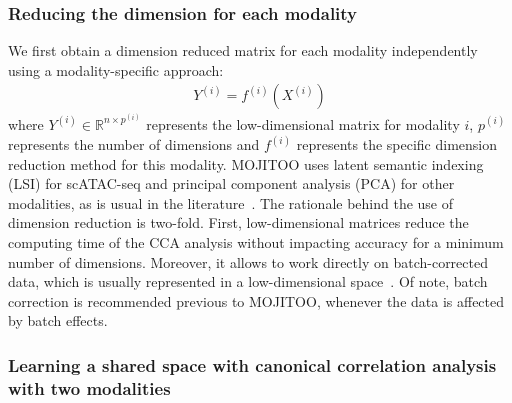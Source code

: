 \subsubsection{Reducing the dimension for each modality}

We first obtain a dimension reduced matrix for each modality independently using a modality-specific approach: 
\begin{align}
    Y^{(i)}=f^{(i)}(X^{(i)})
\end{align}
where $Y^{(i)} \in \mathbb{R}^{n\times p^{(i)}}$ represents the low-dimensional matrix for modality $i$, $p^{(i)}$ represents the number of dimensions and $f^{(i)}$ represents the specific dimension reduction method for this modality. MOJITOO uses latent semantic indexing (LSI) for scATAC-seq and principal component analysis (PCA) for other modalities, as is usual in the literature~\cite{granja2021archr, signac, hao2021integrated}.
The rationale behind the use of dimension reduction is two-fold. First, low-dimensional matrices reduce the computing time of the CCA analysis without impacting accuracy for a minimum number of dimensions. Moreover, it allows to work directly on batch-corrected data, which is usually represented in a low-dimensional space~\cite{hao2021integrated, korsunsky2019fast}. Of note, batch correction is recommended previous to MOJITOO, whenever the data is affected by batch effects. 

\subsubsection{Learning a shared space with canonical correlation analysis with two modalities}

